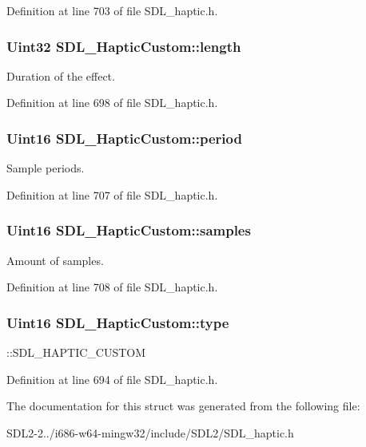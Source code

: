Definition at line 703 of file S\+D\+L\+\_\+haptic.\+h.

\hypertarget{structSDL__HapticCustom_ad70e8bc2cff74b99d704a757c16b363f}{
\subsubsection[{length}]{\setlength{\rightskip}{0pt plus 5cm}Uint32 S\+D\+L\+\_\+\+Haptic\+Custom\+::length}}\label{structSDL__HapticCustom_ad70e8bc2cff74b99d704a757c16b363f}
Duration of the effect. 

Definition at line 698 of file S\+D\+L\+\_\+haptic.\+h.

\hypertarget{structSDL__HapticCustom_aba7fafa808e90baddef25f009b8f4817}{
\subsubsection[{period}]{\setlength{\rightskip}{0pt plus 5cm}Uint16 S\+D\+L\+\_\+\+Haptic\+Custom\+::period}}\label{structSDL__HapticCustom_aba7fafa808e90baddef25f009b8f4817}
Sample periods. 

Definition at line 707 of file S\+D\+L\+\_\+haptic.\+h.

\hypertarget{structSDL__HapticCustom_a5905ea1b6182da846535ca8c80b4fa33}{
\subsubsection[{samples}]{\setlength{\rightskip}{0pt plus 5cm}Uint16 S\+D\+L\+\_\+\+Haptic\+Custom\+::samples}}\label{structSDL__HapticCustom_a5905ea1b6182da846535ca8c80b4fa33}
Amount of samples. 

Definition at line 708 of file S\+D\+L\+\_\+haptic.\+h.

\hypertarget{structSDL__HapticCustom_a98a8995c94492069dc007502ed97eed2}{
\subsubsection[{type}]{\setlength{\rightskip}{0pt plus 5cm}Uint16 S\+D\+L\+\_\+\+Haptic\+Custom\+::type}}\label{structSDL__HapticCustom_a98a8995c94492069dc007502ed97eed2}
\+::\+S\+D\+L\+\_\+\+H\+A\+P\+T\+I\+C\+\_\+\+C\+U\+S\+T\+O\+M 

Definition at line 694 of file S\+D\+L\+\_\+haptic.\+h.



The documentation for this struct was generated from the following file\+:\begin{DoxyCompactItemize}
\item 
S\+D\+L2-\/2../i686-\/w64-\/mingw32/include/\+S\+D\+L2/S\+D\+L\+\_\+haptic.\+h\end{DoxyCompactItemize}
